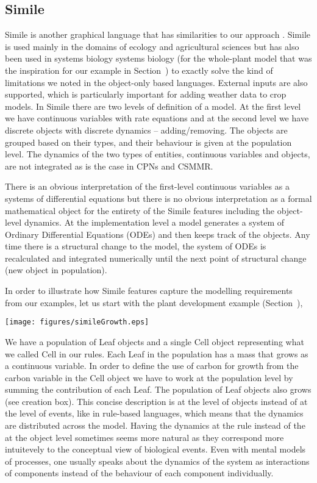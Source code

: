 \subsection{Simile}
\label{subsec:simile}
Simile is another graphical language that has similarities to our approach
\citep{muetzelfeldt_simile_2003}. Simile is used mainly in the domains of
ecology and agricultural sciences but has also been used in systems biology
systems biology (for the whole-plant model \citep{chew_multiscale_2014} that was
the inspiration for our example in Section~) to exactly solve the
kind of limitations we noted in the object-only based languages. External inputs
are also supported, which is particularly important for adding weather data to
crop models. In Simile there are two levels of definition of a model. At the
first level we have continuous variables with rate equations and at the second
level we have discrete objects with discrete dynamics -- adding/removing. The
objects are grouped based on their types, and their behaviour is given at the
population level. The dynamics of the two types of entities, continuous
variables and objects, are not integrated as is the case in CPNs and CSMMR.

There is an obvious interpretation of the first-level continuous variables as a
systems of differential equations but there is no obvious interpretation as a
formal mathematical object for the entirety of the Simile features including the
object-level dynamics. At the implementation level a model generates a system of
Ordinary Differential Equations (ODEs) and then keeps track of the objects. Any
time there is a structural change to the model, the system of ODEs is
recalculated and integrated numerically until the next point of structural
change (\eg new object in population).

In order to illustrate how Simile features capture the modelling requirements from our
examples, let us start with the plant development example (Section~),
\begin{center}
  \texttt{[image: figures/simileGrowth.eps]}
\end{center}
We have a population of Leaf objects and a single Cell object representing what
we called $\mathrm{Cell}$ in our rules. Each Leaf in the population has a mass
that grows as a continuous variable. In order to define the use of carbon for
growth from the carbon variable in the Cell object we have to work at the
population level by summing the contribution of each Leaf. The population of
Leaf objects also grows (see creation box). This concise description is at the
level of objects instead of at the level of events, like in rule-based
languages, which means that the dynamics are distributed across the
model. Having the dynamics at the rule instead of the at the object level
sometimes seems more natural as they correspond more intuitevely to the
conceptual view of biological events. Even with mental models of processes, one
usually speaks about the dynamics of the system as interactions of components
instead of the behaviour of each component individually.


